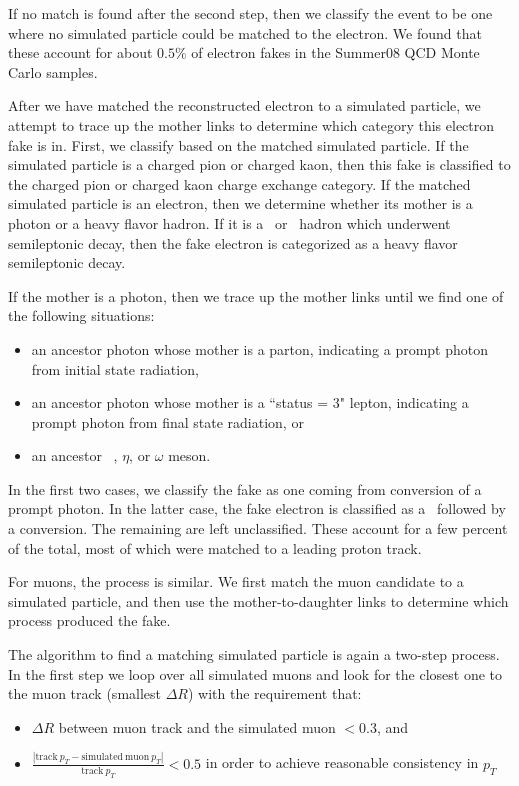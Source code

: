 \documentclass{cmspaper}
\begin{document}
If no match is found after the second step, then we classify the event to be one where no simulated particle could be matched to the electron. We found that these account for about $0.5\%$ of electron fakes in the Summer08 QCD Monte Carlo samples.

After we have matched the reconstructed electron to a simulated particle, we attempt to trace up the mother links to determine which category this electron fake is in. First, we classify based on the matched simulated particle. If the simulated particle is a charged pion or charged kaon, then this fake is classified to the charged pion or charged kaon charge exchange category. If the matched simulated particle is an electron, then we determine whether its mother is a photon or a heavy flavor hadron. If it is a \B\ or \D\ hadron which underwent semileptonic decay, then the fake electron is categorized as a heavy flavor semileptonic decay. 

If the mother is a photon, then we trace up the mother links until we find one of the following situations:
\begin{itemize}
\item an ancestor photon whose mother is a parton, indicating a prompt photon from initial state radiation,
\item an ancestor photon whose mother is a ``status = 3" lepton, indicating a prompt photon from final state radiation, or
\item an ancestor \pizero\ , $\eta$, or $\omega$ meson.
\end{itemize}

In the first two cases, we classify the fake as one coming from conversion of a prompt photon. In the latter case, the fake electron is classified as a \pizero\ followed by a conversion. The remaining are left unclassified. These account for a few percent of the total, most of which were matched to a leading proton track.

For muons, the process is similar. We first match the muon candidate to a simulated particle, and then use the mother-to-daughter links to determine which process produced the fake.  

The algorithm to find a matching simulated particle is again a two-step process. In the first step we loop over all simulated muons and look for the closest one to the muon track (smallest $\Delta R$) with the requirement that: 
\begin{itemize}
\item $\Delta R$ between muon track and the simulated muon $ < 0.3$, and
\item $\frac{|\mathrm{track}\ p_T - \mathrm{simulated\ muon}\ p_T|}{\mathrm{track}\ p_T} < 0.5$ in order to achieve reasonable consistency in $p_T$
\end{itemize}
\end{document}
